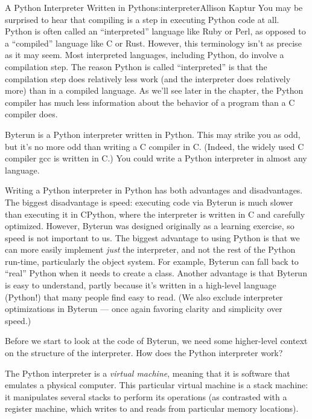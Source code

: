\begin{aosachapter}{A Python Interpreter Written in Python}{s:interpreter}{Allison Kaptur}
You may be surprised to hear that compiling is a step in executing
Python code at all. Python is often called an ``interpreted'' language
like Ruby or Perl, as opposed to a ``compiled'' language like C or Rust.
However, this terminology isn't as precise as it may seem. Most
interpreted languages, including Python, do involve a compilation step.
The reason Python is called ``interpreted'' is that the compilation step
does relatively less work (and the interpreter does relatively more)
than in a compiled language. As we'll see later in the chapter, the
Python compiler has much less information about the behavior of a
program than a C compiler does.

\label{a-python-python-interpreter}

Byterun is a Python interpreter written in Python. This may strike you
as odd, but it's no more odd than writing a C compiler in C. (Indeed,
the widely used C compiler gcc is written in C.) You could write a
Python interpreter in almost any language.

Writing a Python interpreter in Python has both advantages and
disadvantages. The biggest disadvantage is speed: executing code via
Byterun is much slower than executing it in CPython, where the
interpreter is written in C and carefully optimized. However, Byterun
was designed originally as a learning exercise, so speed is not
important to us. The biggest advantage to using Python is that we can
more easily implement \emph{just} the interpreter, and not the rest of
the Python run-time, particularly the object system. For example,
Byterun can fall back to ``real'' Python when it needs to create a
class. Another advantage is that Byterun is easy to understand, partly
because it's written in a high-level language (Python!) that many people
find easy to read. (We also exclude interpreter optimizations in Byterun
--- once again favoring clarity and simplicity over speed.)

\label{building-an-interpreter}

Before we start to look at the code of Byterun, we need some
higher-level context on the structure of the interpreter. How does the
Python interpreter work?

The Python interpreter is a \emph{virtual machine}, meaning that it is
software that emulates a physical computer. This particular virtual
machine is a stack machine: it manipulates several stacks to perform its
operations (as contrasted with a register machine, which writes to and
reads from particular memory locations).


\end{aosachapter}
